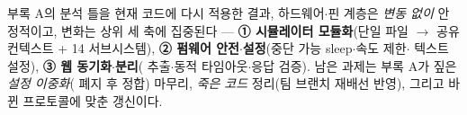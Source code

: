 \begin{infobox}[title=중간 시점 코드 분석 결론]
\small
부록 A의 분석 틀을 현재 코드에 다시 적용한 결과, 하드웨어$\cdot$핀 계층은 \emph{변동 없이}
안정적이고, 변화는 상위 세 축에 집중된다 --- \textbf{① 시뮬레이터 모듈화}(단일 파일 $\to$ 공유
컨텍스트 + 14 서브시스템), \textbf{② 펌웨어 안전$\cdot$설정}(중단 가능 sleep$\cdot$속도 제한$\cdot$%
텍스트 설정), \textbf{③ 웹 동기화$\cdot$분리}( 추출$\cdot$동적 타임아웃$\cdot$응답 검증).
남은 과제는 부록 A가 짚은 \emph{설정 이중화}( 폐지 후 
정합) 마무리,  \emph{죽은 코드} 정리(팀 브랜치 재배선 반영), 그리고
바뀐 프로토콜에 맞춘  갱신이다.
\end{infobox}
